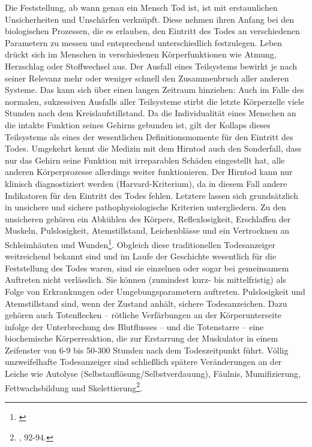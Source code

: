 \documentclass[openany,twoside,twocolumn]{book}
\let\rmarkdownfootnote\footnote%
\def\footnote{\protect\rmarkdownfootnote}
\begin{document}
Die Feststellung, ab wann genau ein Mensch Tod ist, ist mit
erstaunlichen Unsicherheiten und Unschärfen verknüpft. Diese nehmen
ihren Anfang bei den biologischen Prozessen, die es erlauben, den
Eintritt des Todes an verschiedenen Parametern zu messen und
entsprechend unterschiedlich festzulegen. Leben drückt sich im Menschen
in verschiedenen Körperfunktionen wie Atmung, Herzschlag oder
Stoffwechsel aus. Der Ausfall eines Teilsystems bewirkt je nach seiner
Relevanz mehr oder weniger schnell den Zusammenbruch aller anderen
Systeme. Das kann sich über einen langen Zeitraum hinziehen: Auch im
Falle des normalen, sukzessiven Ausfalls aller Teilsysteme stirbt die
letzte Körperzelle viele Stunden nach dem Kreislaufstillstand. Da die
Individualität eines Menschen an die intakte Funktion seines Gehirns
gebunden ist, gilt der Kollaps dieses Teilsystems als eines der
wesentlichen Definitionsmomente für den Eintritt des Todes. Umgekehrt
kennt die Medizin mit dem Hirntod auch den Sonderfall, dass nur das
Gehirn seine Funktion mit irreparablen Schäden eingestellt hat, alle
anderen Körperprozesse allerdings weiter funktionieren. Der Hirntod kann
nur klinisch diagnostiziert werden (Harvard-Kriterium), da in diesem
Fall andere Indikatoren für den Eintritt des Todes fehlen. Letztere
lassen sich grundsätzlich in unsichere und sichere pathophysiologische
Kriterien untergliedern. Zu den unsicheren gehören ein Abkühlen des
Körpers, Reflexlosigkeit, Erschlaffen der Muskeln, Pulslosigkeit,
Atemstillstand, Leichenblässe und ein Vertrocknen an Schleimhäuten und
Wunden\footnote{\textcite{forster_stichwort_1989}}. Obgleich diese
traditionellen Todesanzeiger weitreichend bekannt sind und im Laufe der
Geschichte wesentlich für die Feststellung des Todes waren, sind sie
einzelnen oder sogar bei gemeinsamem Auftreten nicht verlässlich. Sie
können (zumindest kurz- bis mittelfristig) als Folge von Erkrankungen
oder Umgebungsparametern auftreten. Pulslosigkeit und Atemstillstand
sind, wenn der Zustand anhält, sichere Todesanzeichen. Dazu gehören auch
Totenflecken -- rötliche Verfärbungen an der Körperunterseite infolge
der Unterbrechung des Blutflusses -- und die Totenstarre -- eine
biochemische Körperreaktion, die zur Erstarrung der Muskulator in einem
Zeifenster von 6-9 bis 50-300 Stunden nach dem Todeszeitpunkt führt.
Völlig unzweifelhafte Todesanzeiger sind schließlich spätere
Veränderungen an der Leiche wie Autolyse
(Selbstauflösung/Selbstverdauung), Fäulnis, Mumifizierung,
Fettwachsbildung und Skelettierung\footnote{\textcite{hofmann_rituelle_2008},
  92-94.}.
\end{document}
